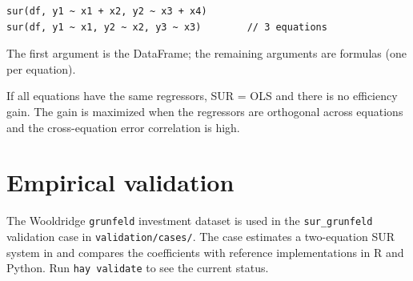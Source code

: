 \begin{lstlisting}
sur(df, y1 ~ x1 + x2, y2 ~ x3 + x4)
sur(df, y1 ~ x1, y2 ~ x2, y3 ~ x3)        // 3 equations
\end{lstlisting}

The first argument is the DataFrame; the remaining arguments are formulas (one per equation).

\begin{nota}
  If all equations have the same regressors, SUR = OLS and there is no
  efficiency gain. The gain is maximized when the regressors are orthogonal
  across equations and the cross-equation error correlation is high.
\end{nota}

\section{Empirical validation}

The Wooldridge \texttt{grunfeld} investment dataset is used in the
\texttt{sur_grunfeld} validation case in \texttt{validation/cases/}. The case
estimates a two-equation SUR system in \hayashi{} and compares the coefficients
with reference implementations in R and Python. Run \lstinline{hay validate} to
see the current status.
